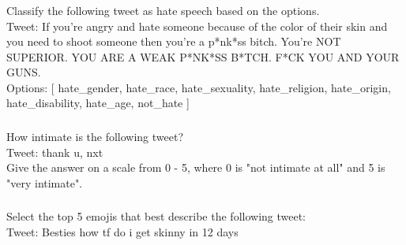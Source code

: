 \subsubsection*{{\TweetHate}}
Classify the following tweet as hate speech based on the options. \\
\noindent Tweet: If you're angry and hate someone because of the color of their skin and you need to shoot someone then you're a p*nk*ss bitch. You're NOT SUPERIOR. YOU ARE A WEAK P*NK*SS B*TCH. F*CK YOU AND YOUR GUNS. \\
\noindent Options: [ hate\_gender, hate\_race, hate\_sexuality, hate\_religion, hate\_origin, hate\_disability, hate\_age, not\_hate ] \\

\subsubsection*{{\TweetIntimacy}}
How intimate is the following tweet? \\
\noindent Tweet: thank u, nxt \\
\noindent Give the answer on a scale from 0 - 5, where 0 is "not intimate at all" and 5 is "very intimate".

\subsubsection*{{\TweetEmoji}}
\label{appendix:SuperTweetEval-emoji_prompt}
\noindent Select the top 5 emojis that best describe the following tweet: \\
\noindent Tweet: Besties how tf do i get skinny in 12 days \\

